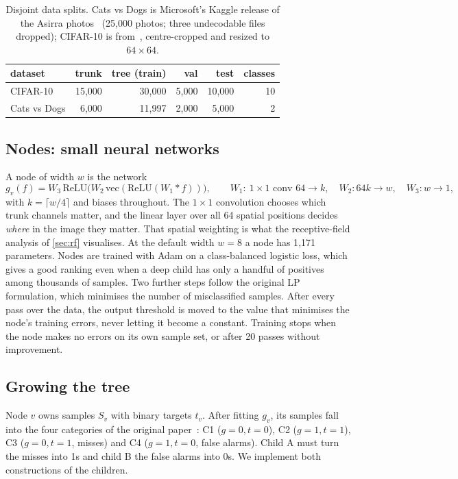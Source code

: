 \begin{table}[t]
\centering
\small
\caption{Disjoint data splits. Cats vs Dogs is Microsoft's Kaggle release of the Asirra photos~\cite{elson2007asirra} (25{,}000 photos;
three undecodable files dropped); CIFAR-10 is from~\cite{krizhevsky2009learning}, centre-cropped and resized to $64\times64$.}
\label{tab:splits}
\begin{tabular}{@{}l r r r r r@{}}
\toprule
dataset & trunk & tree (train) & val & test & classes\\
\midrule
CIFAR-10 & 15{,}000 & 30{,}000 & 5{,}000 & 10{,}000 & 10\\
Cats vs Dogs & 6{,}000 & 11{,}997 & 2{,}000 & 5{,}000 & 2\\
\bottomrule
\end{tabular}
\end{table}

\subsection{Nodes: small neural networks}
\label{sec:node}

A node of width $w$ is the network
\[
g_v(f)=W_3\,\mathrm{ReLU}\big(W_2\,\mathrm{vec}(\mathrm{ReLU}(W_1 * f))\big),\qquad
W_1:\ 1{\times}1\text{ conv } 64\to k,\quad W_2: 64k\to w,\quad W_3: w\to1,
\]
with $k=\lceil w/4\rceil$ and biases throughout. The $1\times1$ convolution chooses which trunk channels matter,
and the linear layer over all 64 spatial positions decides \emph{where} in the image they matter. That
spatial weighting is what the receptive-field analysis of \cref{sec:rf} visualises. At the default width $w=8$
a node has 1{,}171 parameters. Nodes are trained with Adam on a class-balanced logistic loss, which gives a
good ranking even when a deep child has only a handful of positives among thousands of samples. Two further
steps follow the original LP formulation, which minimises the number of misclassified samples. After every
pass over the data, the output threshold is moved to the value that minimises the node's training errors,
never letting it become a constant. Training stops when the node makes no errors on its own sample set, or
after 20 passes without improvement.

\subsection{Growing the tree}
\label{sec:grow}

Node $v$ owns samples $S_v$ with binary targets $t_v$. After fitting $g_v$, its samples fall into the four
categories of the original paper~\cite{jayadeva2021tree}: C1 ($g=0,t=0$), C2 ($g=1,t=1$), C3 ($g=0,t=1$, misses) and C4 ($g=1,t=0$, false
alarms). Child A must turn the misses into 1s and child B the false alarms into 0s. We implement both
constructions of the children.

